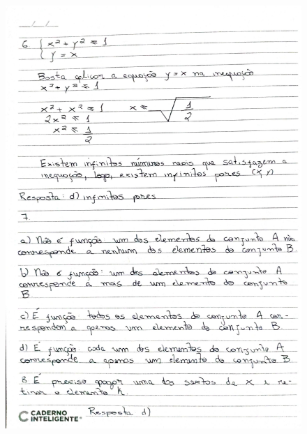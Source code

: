 \documentclass[
  12pt,     %
  openright,      %
  oneside,      %
  a4paper     %
  ]{abntex2}
\begin{document}
\begin{figure}[H]
  \centering
  \includegraphics[scale=0.23]{pagina4.jpg}
\end{figure}
\end{document}
